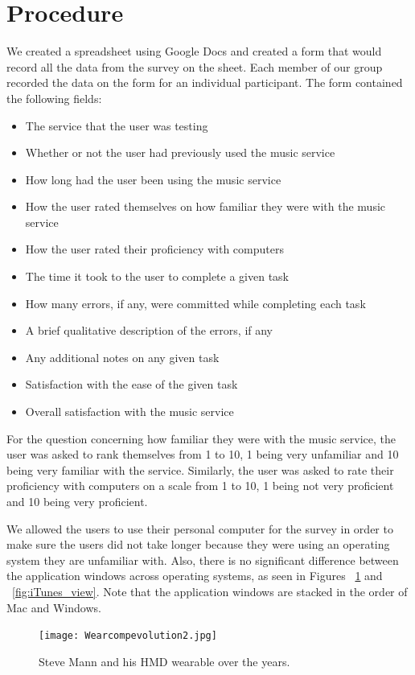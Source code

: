 \documentclass[11pt]{article}
\begin{document}
\section{Procedure}
We created a spreadsheet using Google Docs and created a form that would record all the data from the survey on the sheet. Each member of our group recorded the data on the form for an individual participant. The form contained the following fields:
\begin{itemize}
    \item The service that the user was testing 
    \item Whether or not the user had previously used the music service 
    \item How long had the user been using the music service 
    \item How the user rated themselves on how familiar they were with the music service
    \item How the user rated their proficiency with computers
    \item The time it took to the user to complete a given task
    \item How many errors, if any, were committed while completing each task
    \item A brief qualitative description of the errors, if any
    \item Any additional notes on any given task
    \item Satisfaction with the ease of the given task
    \item Overall satisfaction with the music service
\end{itemize}  
For the question concerning how familiar they were with the music service, the user was asked to rank themselves from 1 to 10, 1 being very unfamiliar and 10 being very familiar with the service. Similarly, the user was asked to rate their proficiency with computers on a scale from 1 to 10, 1 being not very proficient and 10 being very proficient.

We allowed the users to use their personal computer for the survey in order to make sure the users did not take longer because they were using an operating system they are unfamiliar with. Also, there is no significant difference between the application windows across operating systems, as seen in Figures ~\ref{fig:spotify_view} and ~\ref{fig:iTunes_view}. Note that the application windows are stacked in the order of Mac and Windows.

\begin{figure}[H] %
   \centering
   \texttt{[image: Wearcompevolution2.jpg]}       
   \caption{Steve Mann and his HMD wearable over the years. \cite{}}
   \label{fig:spotify_view}
\end{figure}
\end{document}
